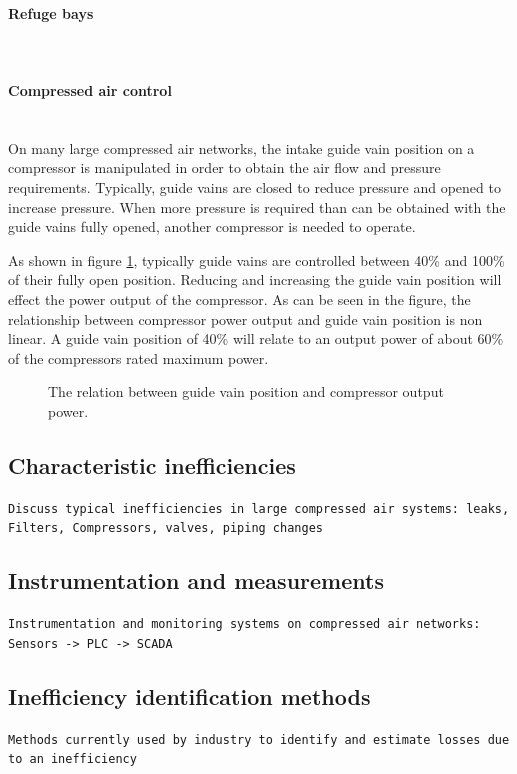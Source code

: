 \paragraph*{Refuge bays}\leavevmode\\
\paragraph*{Compressed air control}\leavevmode\\

On many large compressed air networks, the intake guide vain position on a compressor is manipulated in order to obtain the air flow and pressure requirements. Typically, guide vains are closed to reduce pressure and opened to increase pressure. When more pressure is required than can be obtained with the guide vains fully opened, another compressor is needed to operate.\par
 As shown in figure \ref{fig: Guide vain position}, typically guide vains are controlled between 40\% and 100\% of their fully open position. Reducing and increasing the guide vain position will effect the power output of the compressor. As can be seen in the figure, the relationship between compressor power output and guide vain position is non linear. A guide vain position of 40\% will relate to an output power of about 60\% of the compressors rated maximum power.
 	\begin{figure}[h]
 	\centering
 	\fbox{}
 	\caption[The relation between guide vain position and compressor output power.]{The relation between guide vain position and compressor output power.}
 	\label{fig: Guide vain position}
 \end{figure}
 
	\subsection{Characteristic inefficiencies}
	\texttt{Discuss typical inefficiencies in large  compressed air systems: leaks, Filters, Compressors, valves, piping changes}
	\subsection{Instrumentation and measurements}
	\texttt{Instrumentation and monitoring systems on compressed air networks: Sensors -> PLC -> SCADA}
	\subsection{Inefficiency identification methods}
	\texttt{Methods currently used by industry to identify and estimate losses due to an inefficiency}
	
